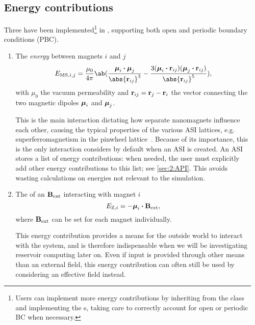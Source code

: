\subsection{Energy contributions}
Three  have been implemented\footnote{
	Users can implement more energy contributions by inheriting from the  class and implementing the s, taking care to correctly account for open or periodic BC when necessary.
} in \hotspice, supporting both open and periodic boundary conditions (PBC).
\begin{enumerate}
	\item The \emph{ energy} between magnets $i$ and $j$
	\begin{equation}
		\label{eq:2:E_MS}
		E_{\mathrm{MS},i,j} = \frac{\mu_0}{4 \pi} \ab(\frac{\vc{\mu}_i \bcdot \vc{\mu}_j}{\abs{\vc{r}_{ij}}^3} - \frac{3(\vc{\mu}_i \bcdot \vc{r}_{ij}) (\vc{\mu}_j \bcdot \vc{r}_{ij})}{\abs{\vc{r}_{ij}}^5}) \mathrm{,}
	\end{equation}
	with $\mu_0$ the vacuum permeability and $\boldsymbol{\mathbf{r}}_{ij} = \boldsymbol{\mathbf{r}}_j - \boldsymbol{\mathbf{r}}_i$ the vector connecting the two magnetic dipoles $\boldsymbol{\mathbf{\mu}}_i$ and $\boldsymbol{\mathbf{\mu}}_j$. \par
	This is the main interaction dictating how separate nanomagnets influence each other, causing the typical properties of the various ASI lattices, e.g. superferromagnetism in the pinwheel lattice~\cite{li2018pinwheel}.
	Because of its importance, this is the only interaction \hotspice considers by default when an ASI is created.
	An ASI stores a list of energy contributions: when needed, the user must explicitly add other energy contributions to this list; see \cref{sec:2:API}.
	This avoids wasting calculations on energies not relevant to the simulation.
	
	\item The  of an  $\boldsymbol{\mathbf{B}}_\mathrm{ext}$ interacting with magnet $i$
	\begin{equation}
		\label{eq:2:E_Z}
		E_{\mathrm{Z},i} = -\boldsymbol{\mathbf{\mu}}_i \boldsymbol{\cdot} \boldsymbol{\mathbf{B}}_\mathrm{ext} \mathrm{,}
	\end{equation}
	where $\boldsymbol{\mathbf{B}}_\mathrm{ext}$ can be set for each magnet individually. \par
	This energy contribution provides a means for the outside world to interact with the system, and is therefore indispensable when we will be investigating reservoir computing later on.
	Even if input is provided through other means than an external field, this energy contribution can often still be used by considering an effective field instead.
	

\end{enumerate}
